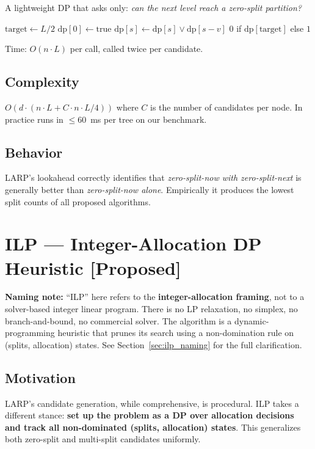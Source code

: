 A lightweight DP that asks only: \textit{can the next level reach a zero-split partition?}

\begin{algorithmic}[1]
\STATE $\text{target} \gets L/2$
\STATE $\text{dp}[0] \gets \text{true}$
        \STATE $\text{dp}[s] \gets \text{dp}[s] \lor \text{dp}[s - v]$
    \ENDFOR
\ENDFOR
\RETURN $0$ if $\text{dp}[\text{target}]$ else $1$
\end{algorithmic}

Time: $O(n \cdot L)$ per call, called twice per candidate.

\subsection{Complexity}

$O(d \cdot (n \cdot L + C \cdot n \cdot L/4))$ where $C$ is the number of candidates per node. In practice runs in $\leq 60$~ms per tree on our benchmark.

\subsection{Behavior}

LARP's lookahead correctly identifies that \textit{zero-split-now with zero-split-next} is generally better than \textit{zero-split-now alone}. Empirically it produces the lowest split counts of all proposed algorithms.

\section{ILP --- Integer-Allocation DP Heuristic [Proposed]}
\label{sec:ilp_algo}

\textbf{Naming note:} ``ILP'' here refers to the \textbf{integer-allocation framing}, not to a solver-based integer linear program. There is no LP relaxation, no simplex, no branch-and-bound, no commercial solver. The algorithm is a dynamic-programming heuristic that prunes its search using a non-domination rule on (splits, allocation) states. See Section~\ref{sec:ilp_naming} for the full clarification.

\subsection{Motivation}

LARP's candidate generation, while comprehensive, is procedural. ILP takes a different stance: \textbf{set up the problem as a DP over allocation decisions and track all non-dominated (splits, allocation) states}. This generalizes both zero-split and multi-split candidates uniformly.

